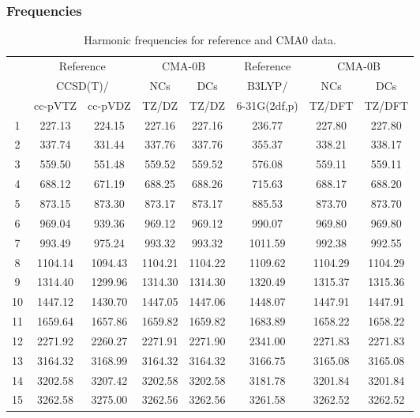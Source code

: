 \documentclass[10pt,oneside]{article}
\begin{document}
\subsubsection*{Frequencies}
\begin{table}[h!]
\centering
\caption{Harmonic frequencies for reference and CMA0 data.}
\begin{tabular}{cccccccc}
\toprule
{} & \multicolumn{2}{c}{Reference} & \multicolumn{2}{c}{CMA-0B} &    Reference & \multicolumn{2}{c}{CMA-0B} \\
{} & \multicolumn{2}{c}{CCSD(T)/} &     NCs &     DCs &       B3LYP/ &     NCs &     DCs \\
{} &   cc-pVTZ & cc-pVDZ &   TZ/DZ &   TZ/DZ & 6-31G(2df,p) &  TZ/DFT &  TZ/DFT \\
\midrule
1  &    227.13 &  224.15 &  227.16 &  227.16 &       236.77 &  227.80 &  227.80 \\
2  &    337.74 &  331.44 &  337.76 &  337.76 &       355.37 &  338.21 &  338.17 \\
3  &    559.50 &  551.48 &  559.52 &  559.52 &       576.08 &  559.11 &  559.11 \\
4  &    688.12 &  671.19 &  688.25 &  688.26 &       715.63 &  688.17 &  688.20 \\
5  &    873.15 &  873.30 &  873.17 &  873.17 &       885.53 &  873.70 &  873.70 \\
6  &    969.04 &  939.36 &  969.12 &  969.12 &       990.07 &  969.80 &  969.80 \\
7  &    993.49 &  975.24 &  993.32 &  993.32 &      1011.59 &  992.38 &  992.55 \\
8  &   1104.14 & 1094.43 & 1104.21 & 1104.22 &      1109.62 & 1104.29 & 1104.29 \\
9  &   1314.40 & 1299.96 & 1314.30 & 1314.30 &      1320.49 & 1315.37 & 1315.36 \\
10 &   1447.12 & 1430.70 & 1447.05 & 1447.06 &      1448.07 & 1447.91 & 1447.91 \\
11 &   1659.64 & 1657.86 & 1659.82 & 1659.82 &      1683.89 & 1658.22 & 1658.22 \\
12 &   2271.92 & 2260.27 & 2271.91 & 2271.90 &      2341.00 & 2271.83 & 2271.83 \\
13 &   3164.32 & 3168.99 & 3164.32 & 3164.32 &      3166.75 & 3165.08 & 3165.08 \\
14 &   3202.58 & 3207.42 & 3202.58 & 3202.58 &      3181.78 & 3201.84 & 3201.84 \\
15 &   3262.58 & 3275.00 & 3262.56 & 3262.56 &      3261.58 & 3262.52 & 3262.52 \\
\bottomrule
\end{tabular}
\end{table}
\end{document}
